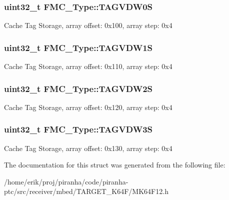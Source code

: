 \subsubsection[{\texorpdfstring{T\+A\+G\+V\+D\+W0S}{TAGVDW0S}}]{ uint32\+\_\+t F\+M\+C\+\_\+\+Type\+::\+T\+A\+G\+V\+D\+W0S}\hypertarget{structFMC__Type_af4beec71c02cec273f84037100e4010d}{}\label{structFMC__Type_af4beec71c02cec273f84037100e4010d}
Cache Tag Storage, array offset\+: 0x100, array step\+: 0x4 
\subsubsection[{\texorpdfstring{T\+A\+G\+V\+D\+W1S}{TAGVDW1S}}]{ uint32\+\_\+t F\+M\+C\+\_\+\+Type\+::\+T\+A\+G\+V\+D\+W1S}\hypertarget{structFMC__Type_a277463c2ce24b62837ed2ed1607d6873}{}\label{structFMC__Type_a277463c2ce24b62837ed2ed1607d6873}
Cache Tag Storage, array offset\+: 0x110, array step\+: 0x4 
\subsubsection[{\texorpdfstring{T\+A\+G\+V\+D\+W2S}{TAGVDW2S}}]{ uint32\+\_\+t F\+M\+C\+\_\+\+Type\+::\+T\+A\+G\+V\+D\+W2S}\hypertarget{structFMC__Type_a29d5155ea94fa1b158e561c465caba8b}{}\label{structFMC__Type_a29d5155ea94fa1b158e561c465caba8b}
Cache Tag Storage, array offset\+: 0x120, array step\+: 0x4 
\subsubsection[{\texorpdfstring{T\+A\+G\+V\+D\+W3S}{TAGVDW3S}}]{ uint32\+\_\+t F\+M\+C\+\_\+\+Type\+::\+T\+A\+G\+V\+D\+W3S}\hypertarget{structFMC__Type_a4f0f05ff2513a816f144035f95408246}{}\label{structFMC__Type_a4f0f05ff2513a816f144035f95408246}
Cache Tag Storage, array offset\+: 0x130, array step\+: 0x4 

The documentation for this struct was generated from the following file\+:\begin{DoxyCompactItemize}
\item 
/home/erik/proj/piranha/code/piranha-\/ptc/src/receiver/mbed/\+T\+A\+R\+G\+E\+T\+\_\+\+K64\+F/M\+K64\+F12.\+h\end{DoxyCompactItemize}
